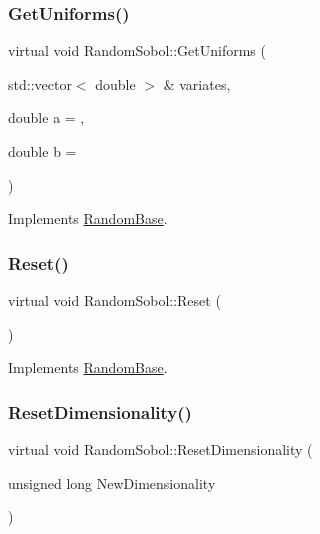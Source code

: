 \subsubsection{\texorpdfstring{Get\+Uniforms()}{GetUniforms()}\hspace{0.1cm}{\footnotesize\ttfamily [2/2]}}
{\footnotesize\ttfamily virtual void Random\+Sobol\+::\+Get\+Uniforms (\begin{DoxyParamCaption}\item[{std\+::vector$<$ double $>$ \&}]{variates,  }\item[{double}]{a = {},  }\item[{double}]{b = {} }\end{DoxyParamCaption})\hspace{0.3cm}{\ttfamily [virtual]}}



Implements \hyperlink{classRandomBase_a3bbf85695dbb1a9462a2b6c3f10af969}{Random\+Base}.

\hypertarget{classRandomSobol_a7a749c87dec7a74d18d22edbb753f65a}{}\label{classRandomSobol_a7a749c87dec7a74d18d22edbb753f65a} 
\subsubsection{\texorpdfstring{Reset()}{Reset()}}
{\footnotesize\ttfamily virtual void Random\+Sobol\+::\+Reset (\begin{DoxyParamCaption}{ }\end{DoxyParamCaption})\hspace{0.3cm}{\ttfamily [virtual]}}



Implements \hyperlink{classRandomBase_a6e35c1467b37fc8c5e262297223685eb}{Random\+Base}.

\hypertarget{classRandomSobol_a14db32657f70fcbb0b3847caacddabc2}{}\label{classRandomSobol_a14db32657f70fcbb0b3847caacddabc2} 
\subsubsection{\texorpdfstring{Reset\+Dimensionality()}{ResetDimensionality()}}
{\footnotesize\ttfamily virtual void Random\+Sobol\+::\+Reset\+Dimensionality (\begin{DoxyParamCaption}\item[{unsigned long}]{New\+Dimensionality }\end{DoxyParamCaption})\hspace{0.3cm}{\ttfamily [virtual]}}



